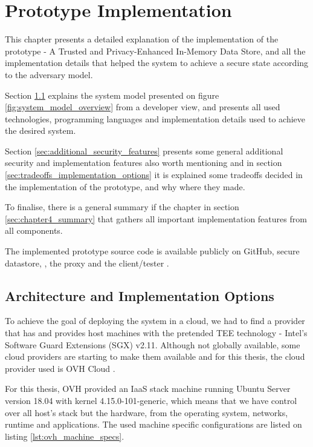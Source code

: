 
\chapter{Prototype Implementation}
\label{cha:elaboration_plan}

This chapter presents a detailed explanation of the implementation of the prototype - A Trusted and Privacy-Enhanced In-Memory Data Store, and all the implementation details that helped the system to achieve a secure state according to the adversary model.

Section \ref{sec:architecture_implementation_options} explains the system model presented on figure \ref{fig:system_model_overview} from a developer view, and presents all used technologies, programming languages and implementation details used to achieve the desired system.

Section \ref{sec:additional_security_features} presents some general additional security and implementation features also worth mentioning and in section \ref{sec:tradeoffs_implementation_options} it is explained some tradeoffs decided in the implementation of the prototype, and why where they made. 

To finalise, there is a general summary if the chapter in section \ref{sec:chapter4_summary} that gathers all important implementation features from all components.

The implemented prototype source code is available publicly on GitHub, secure datastore, \cite{thesis-repository:container}, the proxy \cite{thesis-repository:proxy} and the client/tester \cite{thesis-repository:client}.

\section{Architecture and Implementation Options}
\label{sec:architecture_implementation_options}

To achieve the goal of deploying the system in a cloud, we had to find a provider that has and provides host machines with the pretended \gls{TEE} technology - Intel's Software Guard Extensions (\gls{SGX}) v2.11. Although not globally available, some cloud providers are starting to make them available and for this thesis, the cloud provider used is OVH Cloud \cite{ovhcloud:1}. 

For this thesis, OVH provided an IaaS stack machine running Ubuntu Server version 18.04 with kernel 4.15.0-101-generic, which means that we have control over all host's stack but the hardware, from the operating system, networks, runtime and applications. The used machine specific configurations are listed on listing \ref{lst:ovh_machine_specs}.


